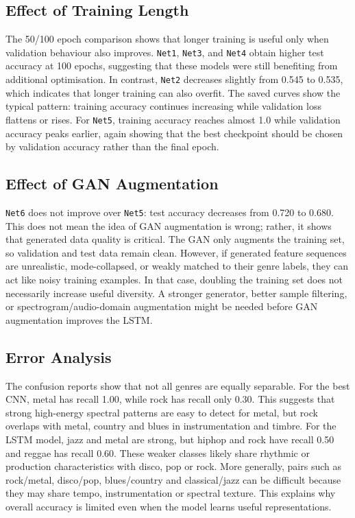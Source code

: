 \documentclass[10pt,twocolumn,letterpaper]{article}
\begin{document}
\subsection{Effect of Training Length}

The 50/100 epoch comparison shows that longer training is useful only when validation behaviour also improves. \texttt{Net1}, \texttt{Net3}, and \texttt{Net4} obtain higher test accuracy at 100 epochs, suggesting that these models were still benefiting from additional optimisation. In contrast, \texttt{Net2} decreases slightly from 0.545 to 0.535, which indicates that longer training can also overfit. The saved curves show the typical pattern: training accuracy continues increasing while validation loss flattens or rises. For \texttt{Net5}, training accuracy reaches almost 1.0 while validation accuracy peaks earlier, again showing that the best checkpoint should be chosen by validation accuracy rather than the final epoch.

\subsection{Effect of GAN Augmentation}

\texttt{Net6} does not improve over \texttt{Net5}: test accuracy decreases from 0.720 to 0.680. This does not mean the idea of GAN augmentation is wrong; rather, it shows that generated data quality is critical. The GAN only augments the training set, so validation and test data remain clean. However, if generated feature sequences are unrealistic, mode-collapsed, or weakly matched to their genre labels, they can act like noisy training examples. In that case, doubling the training set does not necessarily increase useful diversity. A stronger generator, better sample filtering, or spectrogram/audio-domain augmentation might be needed before GAN augmentation improves the LSTM.

\subsection{Error Analysis}

The confusion reports show that not all genres are equally separable. For the best CNN, metal has recall 1.00, while rock has recall only 0.30. This suggests that strong high-energy spectral patterns are easy to detect for metal, but rock overlaps with metal, country and blues in instrumentation and timbre. For the LSTM model, jazz and metal are strong, but hiphop and rock have recall 0.50 and reggae has recall 0.60. These weaker classes likely share rhythmic or production characteristics with disco, pop or rock. More generally, pairs such as rock/metal, disco/pop, blues/country and classical/jazz can be difficult because they may share tempo, instrumentation or spectral texture. This explains why overall accuracy is limited even when the model learns useful representations.
\end{document}
